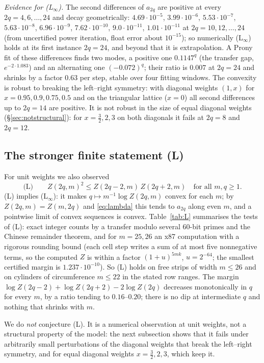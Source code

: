 \documentclass[11pt]{amsart}
\theoremstyle{definition}
\theoremstyle{remark}
\begin{document}
\emph{Evidence for (L$_\infty$).} The second differences of $a_{2q}$ are positive at every
$2q = 4, 6, \dots, 24$ and decay geometrically: $4.69\cdot10^{-5}$, $3.99\cdot10^{-6}$, $5.53\cdot10^{-7}$,
$5.63\cdot10^{-8}$, $6.96\cdot10^{-9}$, $7.62\cdot10^{-10}$, $9.0\cdot10^{-11}$, $1.01\cdot10^{-11}$
at $2q = 10, 12, \dots, 24$ (from uncertified power iteration, float error about $10^{-15}$); so
numerically (L$_\infty$) holds at its first instance $2q = 24$, and beyond that it is
extrapolation. A Prony fit of these differences finds two modes, a positive one $0.1147^q$ (the
transfer gap, $e^{-2\cdot1.083}$) and an alternating one $(-0.072)^q$; their ratio is $0.007$ at
$2q = 24$ and shrinks by a factor $0.63$ per step, stable over four fitting windows. The
convexity is robust to breaking the left--right symmetry: with diagonal weights $(1, x)$ for
$x = 0.95, 0.9, 0.75, 0.5$ and on the triangular lattice ($x = 0$) all second differences up to
$2q = 14$ are positive. It is not robust in the size of equal diagonal weights
(\S\ref{sec:notstructural}): for $x = \tfrac32, 2, 3$ on both diagonals it fails at $2q = 8$ and $2q = 12$.

\subsection{The stronger finite statement (L)}
For unit weights we also observed
\[
  \text{(L)}\qquad Z(2q, m)^2 \le Z(2q - 2, m)\, Z(2q + 2, m) \quad\text{for all } m, q \ge 1 .
\]
(L) implies (L$_\infty$): it makes $q \mapsto m^{-1}\log Z(2q, m)$ convex for each $m$; by
$Z(2q, m) = Z(m, 2q)$ and \eqref{eq:lambda} this tends to $a_{2q}$ along even $m$, and a
pointwise limit of convex sequences is convex. Table~\ref{tab:L} summarises the tests of (L):
exact integer counts by a transfer modulo several $60$-bit primes and the Chinese remainder
theorem, and for $m = 25, 26$ an x87 computation with a rigorous rounding bound (each cell step
writes a sum of at most five nonnegative terms, so the computed $Z$ is within a factor
$(1+u)^{5mk}$, $u = 2^{-64}$; the smallest certified margin is $1.237\cdot10^{-10}$). So (L) holds
on free strips of width $m \le 26$ and on cylinders of circumference $m \le 22$ in the stated
row ranges. The margin $\log Z(2q-2) + \log Z(2q+2) - 2\log Z(2q)$ decreases monotonically in $q$
for every $m$, by a ratio tending to $0.16$--$0.20$; there is no dip at intermediate $q$ and
nothing that shrinks with $m$.

We do \emph{not} conjecture (L). It is a numerical observation at unit weights, not a structural
property of the model: the next subsection shows that it fails under arbitrarily small
perturbations of the diagonal weights that break the left--right symmetry, and for equal
diagonal weights $x = \tfrac32, 2, 3$, which keep it.
\end{document}

